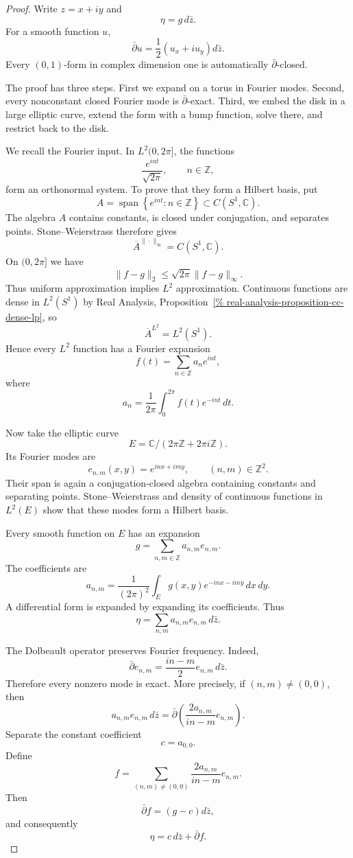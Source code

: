 \begin{proof}
Write $z=x+iy$ and
$$
\eta=g\,d\bar z.
$$
For a smooth function $u$,
$$
\bar\partial u
=
\frac12(u_x+i u_y)d\bar z.
$$
Every $(0,1)$-form in complex dimension one
is automatically $\bar\partial$-closed.

The proof has three steps. First we expand
on a torus in Fourier modes. Second, every
nonconstant closed Fourier mode is
$\bar\partial$-exact. Third, we embed the
disk in a large elliptic curve, extend the
form with a bump function, solve there, and
restrict back to the disk.

We recall the Fourier input. In
$L^2(0,2\pi]$, the functions
$$
\frac{e^{int}}{\sqrt{2\pi}},
\qquad n\in\mathbb Z,
$$
form an orthonormal system. To prove that
they form a Hilbert basis, put
$$
A
=
\operatorname{span}
\left\{
e^{int}:n\in\mathbb Z
\right\}
\subset C(S^1,\mathbb C).
$$
The algebra $A$ contains constants, is
closed under conjugation, and separates
points. Stone--Weierstrass therefore gives
$$
\overline A^{\|\cdot\|_\infty}
=
C(S^1,\mathbb C).
$$
On $(0,2\pi]$ we have
$$
\|f-g\|_2
\leq
\sqrt{2\pi}\|f-g\|_\infty.
$$
Thus uniform approximation implies
$L^2$ approximation. Continuous functions
are dense in $L^2(S^1)$ by Real Analysis,
Proposition~\ref{%
real-analysis-proposition-cc-dense-lp},
so
$$
\overline A^{L^2}=L^2(S^1).
$$
Hence every $L^2$ function has a Fourier
expansion
$$
f(t)=\sum_{n\in\mathbb Z}a_ne^{int},
$$
where
$$
a_n
=
\frac1{2\pi}
\int_0^{2\pi}
f(t)e^{-int}\,dt.
$$

Now take the elliptic curve
$$
E
=
\mathbb C/
(2\pi\mathbb Z+2\pi i\mathbb Z).
$$
Its Fourier modes are
$$
e_{n,m}(x,y)=e^{inx+imy},
\qquad
(n,m)\in\mathbb Z^2.
$$
Their span is again a
conjugation-closed algebra containing
constants and separating points.
Stone--Weierstrass and density of continuous
functions in $L^2(E)$ show that these modes
form a Hilbert basis.

Every smooth function on $E$ has an
expansion
$$
g
=
\sum_{n,m\in\mathbb Z}
a_{n,m}e_{n,m}.
$$
The coefficients are
$$
a_{n,m}
=
\frac1{(2\pi)^2}
\int_E
g(x,y)e^{-inx-imy}\,dx\,dy.
$$
A differential form is expanded by expanding
its coefficients. Thus
$$
\eta
=
\sum_{n,m}
a_{n,m}e_{n,m}\,d\bar z.
$$

The Dolbeault operator preserves Fourier
frequency. Indeed,
$$
\bar\partial e_{n,m}
=
\frac{in-m}{2}
e_{n,m}\,d\bar z.
$$
Therefore every nonzero mode is exact. More
precisely, if $(n,m)\neq(0,0)$, then
$$
a_{n,m}e_{n,m}\,d\bar z
=
\bar\partial
\left(
\frac{2a_{n,m}}{in-m}e_{n,m}
\right).
$$
Separate the constant coefficient
$$
c=a_{0,0}.
$$
Define
$$
f
=
\sum_{(n,m)\neq(0,0)}
\frac{2a_{n,m}}{in-m}e_{n,m}.
$$
Then
$$
\bar\partial f
=
(g-c)d\bar z,
$$
and consequently
$$
\eta=c\,d\bar z+\bar\partial f.
$$


\end{proof}
